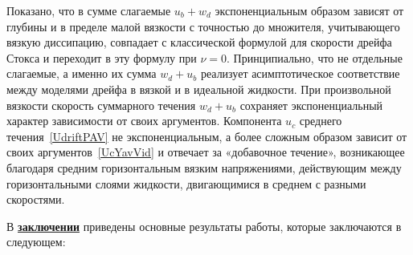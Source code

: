 Показано, что в сумме слагаемые $ u_{b} + w_{d} $ экспоненциальным образом зависят от глубины и в пределе малой вязкости с точностью до множителя, учитывающего вязкую диссипацию, совпадает с классической формулой для скорости дрейфа Стокса и переходит в эту формулу при $ \nu=0 $. Принципиально, что не отдельные слагаемые, а именно их сумма $ w_{d}+u_{b} $ реализует асимптотическое соответствие между моделями дрейфа в вязкой и в идеальной жидкости. При произвольной вязкости скорость суммарного течения $ w_{d}+u_{b} $ сохраняет экспоненциальный характер зависимости от своих аргументов. Компонента $ u_{c} $ среднего течения~\eqref{UdriftPAV} не экспоненциальным, а более сложным образом зависит от своих аргументов~\eqref{UcYavVid} и отвечает за «добавочное течение», возникающее благодаря средним горизонтальным вязким напряжениями, действующим между горизонтальными слоями жидкости, двигающимися в среднем с разными скоростями.


В \underline{\textbf{заключении}} приведены основные результаты работы, которые заключаются в следующем:


